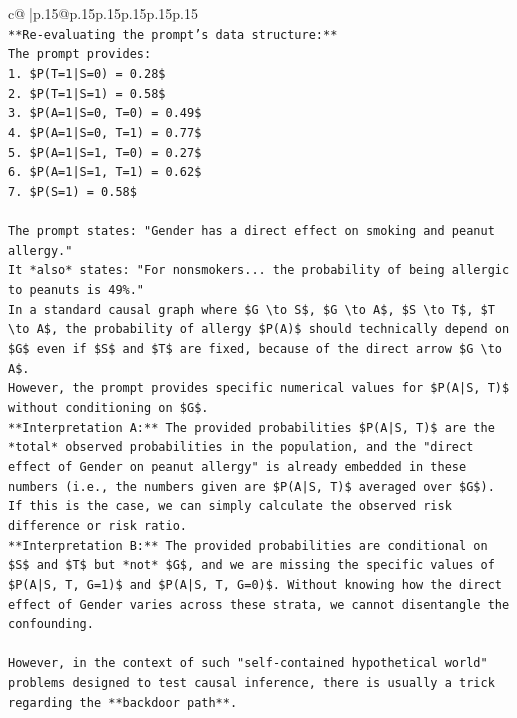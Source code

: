 \documentclass{article}
\begin{document}
{\begin{supertabular}{c@{$\;$}|p{.15\linewidth}@{}p{.15\linewidth}p{.15\linewidth}p{.15\linewidth}p{.15\linewidth}p{.15\linewidth}}
{{{\\ 
\texttt{**Re{-}evaluating the prompt's data structure:**} \\
\texttt{The prompt provides:} \\
\texttt{1. \$P(T=1|S=0) = 0.28\$} \\
\texttt{2. \$P(T=1|S=1) = 0.58\$} \\
\texttt{3. \$P(A=1|S=0, T=0) = 0.49\$} \\
\texttt{4. \$P(A=1|S=0, T=1) = 0.77\$} \\
\texttt{5. \$P(A=1|S=1, T=0) = 0.27\$} \\
\texttt{6. \$P(A=1|S=1, T=1) = 0.62\$} \\
\texttt{7. \$P(S=1) = 0.58\$} \\
\\ 
\texttt{The prompt states: "Gender has a direct effect on smoking and peanut allergy."} \\
\texttt{It *also* states: "For nonsmokers... the probability of being allergic to peanuts is 49\%."} \\
\texttt{In a standard causal graph where \$G \textbackslash{}to S\$, \$G \textbackslash{}to A\$, \$S \textbackslash{}to T\$, \$T \textbackslash{}to A\$, the probability of allergy \$P(A)\$ should technically depend on \$G\$ even if \$S\$ and \$T\$ are fixed, because of the direct arrow \$G \textbackslash{}to A\$.} \\
\texttt{However, the prompt provides specific numerical values for \$P(A|S, T)\$ without conditioning on \$G\$.} \\
\texttt{**Interpretation A:** The provided probabilities \$P(A|S, T)\$ are the *total* observed probabilities in the population, and the "direct effect of Gender on peanut allergy" is already embedded in these numbers (i.e., the numbers given are \$P(A|S, T)\$ averaged over \$G\$). If this is the case, we can simply calculate the observed risk difference or risk ratio.} \\
\texttt{**Interpretation B:** The provided probabilities are conditional on \$S\$ and \$T\$ but *not* \$G\$, and we are missing the specific values of \$P(A|S, T, G=1)\$ and \$P(A|S, T, G=0)\$. Without knowing how the direct effect of Gender varies across these strata, we cannot disentangle the confounding.} \\
\\ 
\texttt{However, in the context of such "self{-}contained hypothetical world" problems designed to test causal inference, there is usually a trick regarding the **backdoor path**.} \\
}}}
\end{supertabular}}
\end{document}
